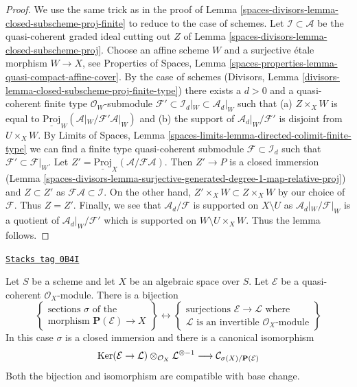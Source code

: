 \begin{proof}
We use the same trick as in the proof of
Lemma \ref{spaces-divisors-lemma-closed-subscheme-proj-finite}
to reduce to the case of schemes.
Let $\mathcal{I} \subset \mathcal{A}$ be the quasi-coherent graded
ideal cutting out $Z$ of Lemma \ref{spaces-divisors-lemma-closed-subscheme-proj}.
Choose an affine scheme $W$ and a surjective \'etale morphism
$W \to X$, see Properties of Spaces, Lemma
\ref{spaces-properties-lemma-quasi-compact-affine-cover}.
By the case of schemes
(Divisors, Lemma \ref{divisors-lemma-closed-subscheme-proj-finite-type})
there exists a $d > 0$ and a quasi-coherent finite type
$\mathcal{O}_W$-submodule
$\mathcal{F}' \subset \mathcal{I}_d|_W \subset \mathcal{A}_d|_W$
such that (a) $Z \times_X W$ is equal to
$\underline{\text{Proj}}_W(\mathcal{A}|_W/\mathcal{F}'\mathcal{A}|_W)$
and (b) the support of $\mathcal{A}_d|_W/\mathcal{F}'$ is disjoint from
$U \times_X W$. By Limits of Spaces, Lemma
\ref{spaces-limits-lemma-directed-colimit-finite-type}
we can find a finite type quasi-coherent submodule
$\mathcal{F} \subset \mathcal{I}_d$ such that
$\mathcal{F}' \subset \mathcal{F}|_W$. Let
$Z' = \underline{\text{Proj}}_X(\mathcal{A}/\mathcal{F}\mathcal{A})$.
Then $Z' \to P$ is a closed immersion
(Lemma \ref{spaces-divisors-lemma-surjective-generated-degree-1-map-relative-proj})
and $Z \subset Z'$ as $\mathcal{F}\mathcal{A} \subset \mathcal{I}$.
On the other hand, $Z' \times_X W \subset Z \times_X W$ by our
choice of $\mathcal{F}$. Thus $Z = Z'$.
Finally, we see that $\mathcal{A}_d/\mathcal{F}$ is supported on
$X \setminus U$ as $\mathcal{A}_d|_W/\mathcal{F}|_W$ is a quotient
of $\mathcal{A}_d|_W/\mathcal{F}'$ which is supported on
$W \setminus U \times_X W$. Thus the lemma follows.
\end{proof}

\begin{lemma}
\label{spaces-divisors-lemma-conormal-sheaf-section-projective-bundle}
\href{https://stacks.math.columbia.edu/tag/0B4I}{\texttt{Stacks tag 0B4I}}

Let $S$ be a scheme and let $X$ be an algebraic space over $S$.
Let $\mathcal{E}$ be a quasi-coherent $\mathcal{O}_X$-module.
There is a bijection
$$
\left\{
\begin{matrix}
\text{sections }\sigma\text{ of the } \\
\text{morphism } \mathbf{P}(\mathcal{E}) \to X
\end{matrix}
\right\}
\leftrightarrow
\left\{
\begin{matrix}
\text{surjections }\mathcal{E} \to \mathcal{L}\text{ where} \\
\mathcal{L}\text{ is an invertible }\mathcal{O}_X\text{-module}
\end{matrix}
\right\}
$$
In this case $\sigma$ is a closed immersion and there is a canonical
isomorphism
$$
\operatorname{Ker}(\mathcal{E} \to \mathcal{L})
\otimes_{\mathcal{O}_X} \mathcal{L}^{\otimes -1}
\longrightarrow
\mathcal{C}_{\sigma(X)/\mathbf{P}(\mathcal{E})}
$$
Both the bijection and isomorphism are compatible with base change.
\end{lemma}

